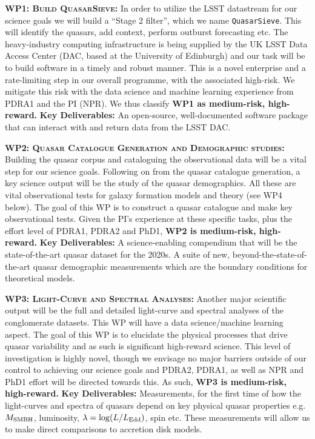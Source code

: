 \documentclass[oneside, a4paper, onecolumn, 11pt]{article}
\begin{document}
\smallskip
\smallskip
\noindent
\textbf{\textsc{WP1: Build QuasarSieve:}} 
In order to utilize the LSST datastream for our science goals we will
build a ``Stage 2 filter'', which we name {\tt QuasarSieve}.  This
will identify the quasars, add context, perform outburst forecasting
etc.  The heavy-industry computing infrastructure is being supplied by
the UK LSST Data Access Center (DAC, based at the University of
Edinburgh) and our task will be to build software in a timely and
robust manner.  This is a novel enterprise and a rate-limiting step in
our overall programme, with the associated high-risk.  We mitigate
this risk with the data science and machine learning experience from
PDRA1 and the PI (NPR).  We thus classify {\bf WP1 as medium-risk,
high-reward.}  {\bf Key Deliverables:} An open-source, well-documented
software package that can interact with and return data from the LSST DAC.


\smallskip
\smallskip
\noindent
\textbf{\textsc{WP2: Quasar Catalogue Generation and Demographic studies:}}  
Building the quasar corpus and cataloguing the observational data will
be a vital step for our science goals.  Following on from the quasar
catalogue generation, a key science output will be the study of the
quasar demographics.  All these are vital observational tests for
galaxy formation models and theory (see WP4 below). The goal of this
WP is to construct a quasar catalogue and make key observational
tests.  Given the PI's experience at these specific tasks, plus the
effort level of PDRA1, PDRA2 and PhD1, {\bf WP2 is medium-risk,
high-reward.}  {\bf Key Deliverables:} A science-enabling compendium
that will be the state-of-the-art quasar dataset for the 2020s.  A
suite of new, beyond-the-state-of-the-art quasar demographic
measurements which are the boundary conditions for theoretical models.


\smallskip
\smallskip
\noindent
\textbf{\textsc{WP3: Light-Curve and Spectral Analyses:}} 
Another major scientific output will be the full and detailed
light-curve and spectral analyses of the conglomerate datasets.  This
WP will have a data science/machine learning aspect.  The goal of this
WP is to elucidate the physical processes that drive quasar
variability and as such is significant high-reward science.  This
level of investigation is highly novel, though we envisage no major
barriers outside of our control to achieving our science goals and
PDRA2, PDRA1, as well as NPR and PhD1 effort will be directed towards
this.  As such, {\bf WP3 is medium-risk, high-reward.}  {\bf Key
Deliverables:} Measurements, for the first time of how the
light-curves and spectra of quasars depend on key physical quasar
properties e.g. $M_{\rm SMBH}$, luminosity, $\lambda = \log (L /
L_{\rm Edd})$, spin etc.  These measurements will allow us to make
direct comparisons to accretion disk models.
\end{document}
